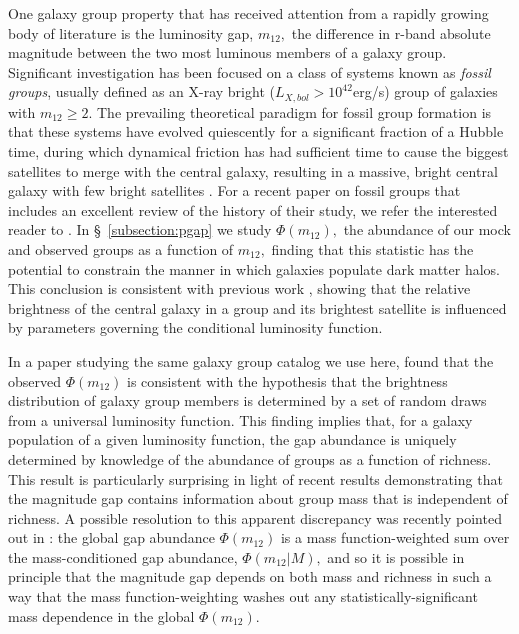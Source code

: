 \documentclass[usenatbib,usegraphicx,letterpaper]{mn2e}
\newcommand{\monetwo}{m_{12}}
\begin{document}
One galaxy group property that has received attention from a rapidly
growing body of literature is the luminosity gap, $\monetwo,$ the
difference in r-band absolute magnitude between the two most luminous
members of a galaxy group. Significant investigation has been focused on a
class of systems known as {\em fossil groups}, usually defined
as an X-ray bright ($L_{X,bol}>10^{42}$erg/s) group of galaxies with
$\monetwo \geq 2.$ The prevailing theoretical paradigm for 
fossil group formation is that these systems 
have evolved quiescently for a significant fraction
of a Hubble time, during which dynamical friction has had sufficient time to cause
the biggest satellites to merge with the central galaxy, resulting in
a massive, bright central galaxy with few bright satellites
\citep{ponman94,jones_etal03,donghia_etal05,donghia_etal07,dariush_etal07,vonbendabeckmann_etal08,milosavljevic_etal06,vikhlinin_etal99,miller_etal11,labarbera_etal12,tavasoli_etal11}. 
For a recent paper on fossil groups that includes an excellent review of
the history of their study, we refer the interested reader to
\citet{harrison_etal12}. In \S~\ref{subsection:pgap} we study
$\Phi(\monetwo),$ the abundance of our mock and observed groups as a
function of $\monetwo,$ finding that this statistic has the potential 
to constrain the manner in which galaxies populate dark
matter halos. This conclusion is consistent with previous work
\citep{skibba_etal07}, showing that the relative brightness of the
central galaxy in a group and its brightest satellite is influenced by
parameters governing the conditional luminosity function.

In a paper studying the same galaxy group catalog we use here,
\citet{paranjape_sheth11} found that the observed $\Phi(\monetwo)$ is
consistent with the hypothesis that the brightness distribution of
galaxy group members is determined by a set of random draws from a
universal luminosity function. This finding implies that, for a galaxy
population of a given luminosity function, the gap abundance is
uniquely determined by knowledge of the abundance of groups as a
function of richness. This result is particularly surprising in light
of recent results \citep{hearin_etal12} demonstrating that the
magnitude gap contains information about group mass that is
independent of richness. A possible resolution to this apparent
discrepancy was recently pointed out in \citet{more12}: the global gap
abundance $\Phi(\monetwo)$ is a mass function-weighted sum over the
mass-conditioned gap abundance, $\Phi(\monetwo|M),$ and so it is
possible in principle that the magnitude gap depends on both mass and richness in
such a way that the mass function-weighting washes out any
statistically-significant mass dependence in the global
$\Phi(\monetwo).$ 
\end{document}
